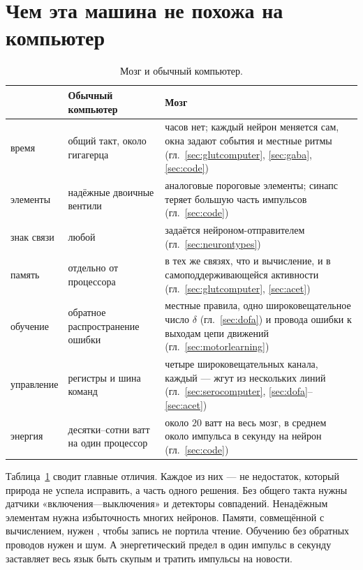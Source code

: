 \section{Чем эта машина не похожа на компьютер}

\begin{table}[t]
\centering
\footnotesize
\setlength{\tabcolsep}{4pt}
\renewcommand{\arraystretch}{1.15}
\begin{tabular}{>{\raggedright}p{2.2cm}>{\raggedright}p{4.2cm}>{\raggedright\arraybackslash}p{6.6cm}}
\toprule
& Обычный компьютер & Мозг \\
\midrule
время & общий такт, около гигагерца & часов нет; каждый нейрон меняется сам, окна задают события и местные ритмы (гл.~\ref{sec:glutcomputer}, \ref{sec:gaba}, \ref{sec:code}) \\
элементы & надёжные двоичные вентили & аналоговые пороговые элементы; синапс теряет большую часть импульсов (гл.~\ref{sec:code}) \\
знак связи & любой & задаётся нейроном-отправителем (гл.~\ref{sec:neurontypes}) \\
память & отдельно от процессора & в тех же связях, что и вычисление, и в самоподдерживающейся активности (гл.~\ref{sec:glutcomputer}, \ref{sec:acet}) \\
обучение & обратное распространение ошибки & местные правила, одно широковещательное число $\delta$ (гл.~\ref{sec:dofa}) и провода ошибки к выходам цепи движений (гл.~\ref{sec:motorlearning}) \\
управление & регистры и шина команд & четыре широковещательных канала, каждый --- жгут из нескольких линий (гл.~\ref{sec:serocomputer}, \ref{sec:dofa}--\ref{sec:acet}) \\
энергия & десятки--сотни ватт на один процессор & около $20$ ватт на весь мозг, в среднем около импульса в секунду на нейрон (гл.~\ref{sec:code}) \\
\bottomrule
\end{tabular}
\caption{Мозг и обычный компьютер.}
\label{tab:computer}
\end{table}

Таблица~\ref{tab:computer} сводит главные отличия. Каждое из них --- не недостаток, который природа не успела исправить, а часть одного решения. Без общего такта нужны датчики «включения---выключения» и детекторы совпадений. Ненадёжным элементам нужна избыточность многих нейронов. Памяти, совмещённой с вычислением, нужен , чтобы запись не портила чтение. Обучению без обратных проводов нужен  и шум. А энергетический предел в один импульс в секунду заставляет весь язык быть скупым и тратить импульсы на новости.

